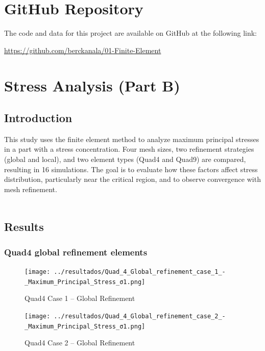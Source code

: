 \documentclass[12pt]{article}
\begin{document}
\thispagestyle{empty}
\newpage
{}
\setcounter{page}{1}

\newpage
\section*{GitHub Repository}

The code and data for this project are available on GitHub at the following link:
\begin{center}
    \url{https://github.com/berckanala/01-Finite-Element}
\end{center}


\newpage
\section{Stress Analysis (Part B)}

\subsection{Introduction}
This study uses the finite element method to analyze maximum principal stresses in a part with a stress concentration. Four mesh sizes, two refinement strategies (global and local), and two element types (Quad4 and Quad9) are compared, resulting in 16 simulations. The goal is to evaluate how these factors affect stress distribution, particularly near the critical region, and to observe convergence with mesh refinement.
\\
\\
\newpage
\subsection{Results}

\subsubsection{Quad4 global refinement elements}

\begin{figure}[H]
    \centering
    \begin{minipage}{0.48\textwidth}
        \centering
        \texttt{[image: ../resultados/Quad\_4\_Global\_refinement\_case\_1\_-\_Maximum\_Principal\_Stress\_σ1.png]}
        \caption{Quad4 Case 1 – Global Refinement}
        \label{fig:quad4_results_global1}
    \end{minipage}
    \hfill
    \begin{minipage}{0.48\textwidth}
        \centering
        \texttt{[image: ../resultados/Quad\_4\_Global\_refinement\_case\_2\_-\_Maximum\_Principal\_Stress\_σ1.png]}
        \caption{Quad4 Case 2 – Global Refinement}
        \label{fig:quad4_results_global2}
    \end{minipage}
\end{figure}
\end{document}
